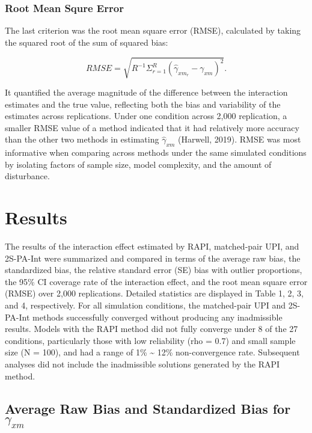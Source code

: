 \documentclass[
  man]{apa6}
\begin{document}
\hypertarget{root-mean-squre-error}{%
\subsubsection{Root Mean Squre Error}\label{root-mean-squre-error}}

The last criterion was the root mean square error (RMSE), calculated by taking the squared root of the sum of squared bias:

\begin{equation}
RMSE = \sqrt{R^{-1}\Sigma^{R}_{r = 1}(\hat{\gamma}_{xm_{r}} - \gamma_{xm})^2}.
\end{equation}

It quantified the average magnitude of the difference between the interaction estimates and the true value, reflecting both the bias and variability of the estimates across replications. Under one condition across 2,000 replication, a smaller RMSE value of a method indicated that it had relatively more accuracy than the other two methods in estimating \(\hat{\gamma}_{xm}\) (Harwell, 2019). RMSE was most informative when comparing across methods under the same simulated conditions by isolating factors of sample size, model complexity, and the amount of disturbance.

\hypertarget{results}{%
\section{Results}\label{results}}

The results of the interaction effect estimated by RAPI, matched-pair UPI, and 2S-PA-Int were summarized and compared in terms of the average raw bias, the standardized bias, the relative standard error (SE) bias with outlier proportions, the 95\% CI coverage rate of the interaction effect, and the root mean square error (RMSE) over 2,000 replications. Detailed statistics are displayed in Table 1, 2, 3, and 4, respectively. For all simulation conditions, the matched-pair UPI and 2S-PA-Int methods successfully converged without producing any inadmissible results. Models with the RAPI method did not fully converge under 8 of the 27 conditions, particularly those with low reliability (rho = 0.7) and small sample size (N = 100), and had a range of 1\% \textasciitilde{} 12\% non-convergence rate. Subsequent analyses did not include the inadmissible solutions generated by the RAPI method.

\hypertarget{average-raw-bias-and-standardized-bias-for-gamma_xm}{%
\subsection{\texorpdfstring{Average Raw Bias and Standardized Bias for \(\gamma_{xm}\)}{Average Raw Bias and Standardized Bias for \textbackslash gamma\_\{xm\}}}\label{average-raw-bias-and-standardized-bias-for-gamma_xm}}
\end{document}
